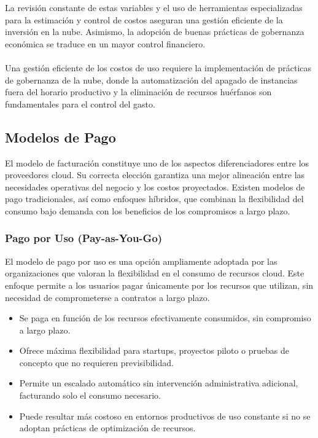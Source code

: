 {                La revisión constante de estas variables y el uso de herramientas especializadas para la estimación y control de costos aseguran una gestión eficiente de la inversión en la nube. Asimismo, la adopción de buenas prácticas de gobernanza económica se traduce en un mayor control financiero.
                
                \paragraph{} Una gestión eficiente de los costos de uso requiere la implementación de prácticas de gobernanza de la nube, donde la automatización del apagado de instancias fuera del horario productivo y la eliminación de recursos huérfanos son fundamentales para el control del gasto.
                
        \subsection{Modelos de Pago}
                
            El modelo de facturación constituye uno de los aspectos diferenciadores entre los proveedores cloud. Su correcta elección garantiza una mejor alineación entre las necesidades operativas del negocio y los costos proyectados. Existen modelos de pago tradicionales, así como enfoques híbridos, que combinan la flexibilidad del consumo bajo demanda con los beneficios de los compromisos a largo plazo.
                
            \subsubsection{Pago por Uso (Pay-as-You-Go)}
                El modelo de pago por uso es una opción ampliamente adoptada por las organizaciones que valoran la flexibilidad en el consumo de recursos cloud. Este enfoque permite a los usuarios pagar únicamente por los recursos que utilizan, sin necesidad de comprometerse a contratos a largo plazo.
                
                \begin{itemize}
                    \item Se paga en función de los recursos efectivamente consumidos, sin compromiso a largo plazo.
                    \item Ofrece máxima flexibilidad para startups, proyectos piloto o pruebas de concepto que no requieren previsibilidad.
                    \item Permite un escalado automático sin intervención administrativa adicional, facturando solo el consumo necesario.
                    \item Puede resultar más costoso en entornos productivos de uso constante si no se adoptan prácticas de optimización de recursos.
                \end{itemize}

}
